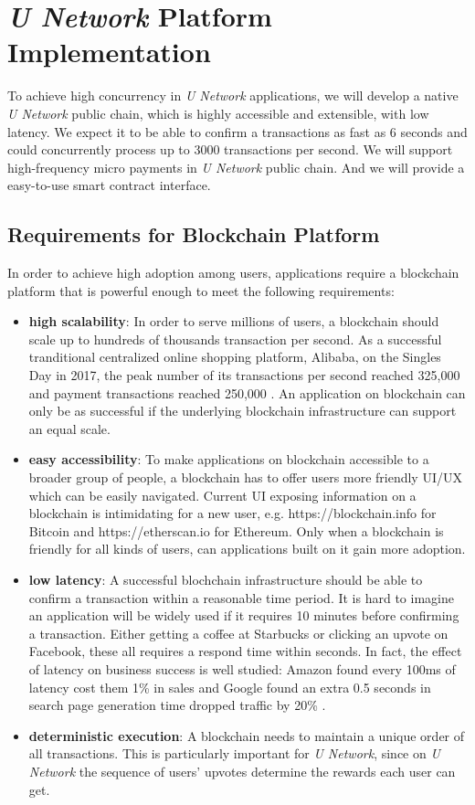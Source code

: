 \chapter{\emph{U Network} Platform Implementation}
To achieve high concurrency in \emph{U Network} applications, we will develop a native \emph{U Network} public chain, which is highly accessible and extensible, with low latency. We expect it to be able to confirm a transactions as fast as 6 seconds and could concurrently process up to 3000 transactions per second. 
We will support high-frequency micro payments in \emph{U Network} public chain. And we will provide a easy-to-use smart contract interface. 

\section{Requirements for Blockchain Platform}
In order to achieve high adoption among users, applications require a blockchain platform that is powerful enough to meet the following requirements:
\begin{itemize}
\item {\bf high scalability}: In order to serve millions of users, a blockchain should scale up to hundreds of thousands transaction per second. As a successful tranditional centralized online shopping platform, Alibaba, on the Singles Day in 2017, the peak number of its transactions per second reached 325,000 and payment transactions reached 250,000 \cite{spencerkimball}. An application on blockchain can only be as successful if the underlying blockchain infrastructure can support an equal scale.
\item {\bf easy accessibility}: To make applications on blockchain accessible to a broader group of people, a blockchain has to offer users more friendly UI/UX which can be easily navigated. Current UI exposing information on a blockchain is intimidating for a new user, e.g. https://blockchain.info for Bitcoin and https://etherscan.io for Ethereum. Only when a blockchain is friendly for all kinds of users, can applications built on it gain more adoption.
\item {\bf low latency}: A successful blochchain infrastructure should be able to confirm a transaction within a reasonable time period. It is hard to imagine an application will be widely used if it requires 10 minutes before confirming a transaction. Either getting a coffee at Starbucks or clicking an upvote on Facebook, these all requires a respond time within seconds. In fact, the effect of latency on business success is well studied: Amazon found every 100ms of latency cost them 1\% in sales and Google found an extra 0.5 seconds in search page generation time dropped traffic by 20\% \cite{amazonlatency}. 
\item {\bf deterministic execution}: A blockchain needs to maintain a unique order of all transactions. This is particularly important for \emph{U Network}, since on \emph{U Network} the sequence of users' upvotes determine the rewards each user can get.
\end{itemize}


